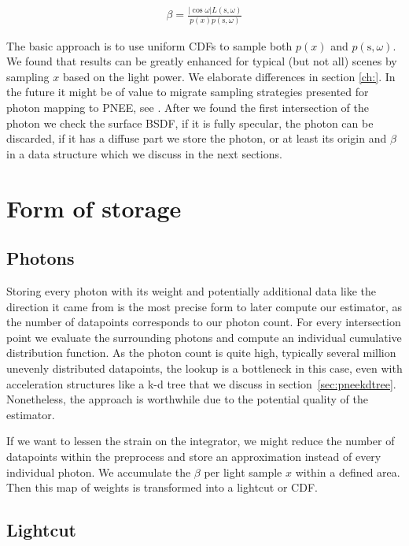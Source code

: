 \begin{align}\label{eq:beta}
\beta = \frac{|\cos{\omega}|L(\text{s}, \omega)}{p(x)p(\text{s}, \omega)}
\end{align}

The basic approach is to use uniform CDFs to sample both $p(x)$ and $p(\text{s}, \omega)$. We found that results can be greatly enhanced for typical (but not all) scenes by sampling $x$ based on the light power. We elaborate differences in section \ref{ch:}. In the future it might be of value to migrate sampling strategies presented for photon mapping to PNEE, see \cite{DBLP:conf/rt/SuykensW00}. After we found the first intersection of the photon we check the surface BSDF, if it is fully specular, the photon can be discarded, if it has a diffuse part we store the photon, or at least its origin and $\beta$ in a data structure which we discuss in the next sections.

\section{Form of storage}
\label{ch:formofstorage}

\subsection{Photons}

Storing every photon with its weight and potentially additional data like the direction it came from is the most precise form to later compute our estimator, as the number of datapoints corresponds to our photon count. For every intersection point we evaluate the surrounding photons and compute an individual cumulative distribution function. As the photon count is quite high, typically several million unevenly distributed datapoints, the lookup is a bottleneck in this case, even with acceleration structures like a k-d tree that we discuss in section~\ref{sec:pneekdtree}. Nonetheless, the approach is worthwhile due to the potential quality of the estimator.

If we want to lessen the strain on the integrator, we might reduce the number of datapoints within the preprocess and store an approximation instead of every individual photon. We accumulate the $\beta$ per light sample $x$ within a defined area. Then this map of weights is transformed into a lightcut or CDF.

\subsection{Lightcut}

